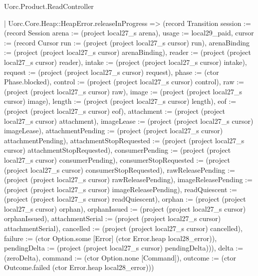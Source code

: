 \begin{lexlean}{Uorc.Product.ReadController}
\begin{semanticmodule}
{    | Uorc.Core.Heap::HeapError.releaseInProgress => (record Transition {session := (record Session {arena := (project local27_s arena), usage := local29_paid, cursor := (record Cursor {run := (project (project local27_s cursor) run), arenaBinding := (project (project local27_s cursor) arenaBinding), reader := (project (project local27_s cursor) reader), intake := (project (project local27_s cursor) intake), request := (project (project local27_s cursor) request), phase := (ctor Phase.blocked), control := (project (project local27_s cursor) control), raw := (project (project local27_s cursor) raw), image := (project (project local27_s cursor) image), length := (project (project local27_s cursor) length), eof := (project (project local27_s cursor) eof), attachment := (project (project local27_s cursor) attachment), imageLease := (project (project local27_s cursor) imageLease), attachmentPending := (project (project local27_s cursor) attachmentPending), attachmentStopRequested := (project (project local27_s cursor) attachmentStopRequested), consumerPending := (project (project local27_s cursor) consumerPending), consumerStopRequested := (project (project local27_s cursor) consumerStopRequested), rawReleasePending := (project (project local27_s cursor) rawReleasePending), imageReleasePending := (project (project local27_s cursor) imageReleasePending), readQuiescent := (project (project local27_s cursor) readQuiescent), orphan := (project (project local27_s cursor) orphan), orphanIssued := (project (project local27_s cursor) orphanIssued), attachmentSerial := (project (project local27_s cursor) attachmentSerial), cancelled := (project (project local27_s cursor) cancelled), failure := (ctor Option.some [Error] (ctor Error.heap local28_error)), pendingDelta := (project (project local27_s cursor) pendingDelta)})}), delta := (zeroDelta), command := (ctor Option.none [Command]), outcome := (ctor Outcome.failed (ctor Error.heap local28_error))})
}
\end{semanticmodule}
\end{lexlean}
